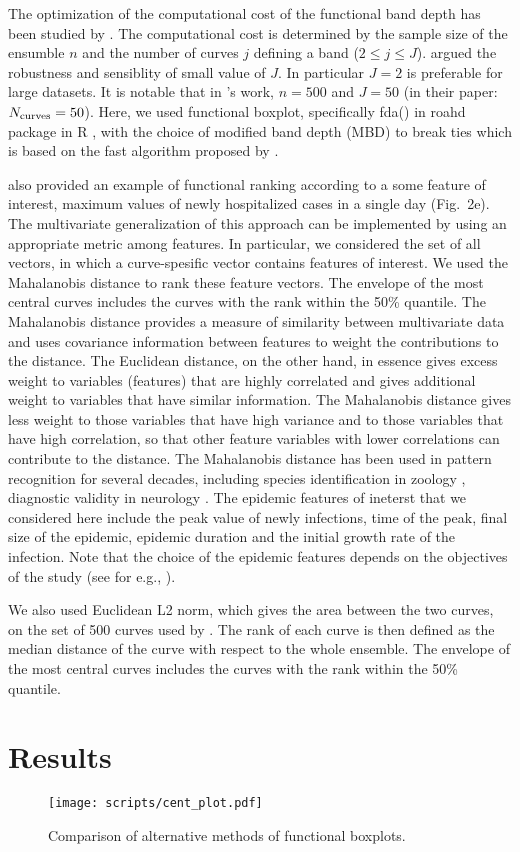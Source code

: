 \documentclass[12pt]{article}
\newcommand{\pkg}[1]{\textsf{#1}}  %
\theoremstyle{definition} %
\begin{document}
The optimization of the computational cost of the functional band depth has been studied by \citep{sun2012exact}. The computational cost is determined by the sample size of the ensumble $n$ and the number of curves $j$ defining a band ($2\leq j \leq J$). \cite{sun2012exact} argued the robustness and sensiblity of  small value of $J$. In particular $J=2$ is preferable for large datasets. It is notable that in \cite{juul2021fixed}'s work, $n=500$ and $J=50$ (in their paper: $N_{\rm{curves}}=50$). Here, we used functional boxplot, specifically fda() in \pkg{roahd} package \citep{roahd} in R \citep{R}, with the choice of modified band depth (MBD) to break ties which is based on the fast algorithm proposed by \cite{sun2012exact}.  

\cite{juul2021fixed} also provided an example of functional ranking according to a some feature of interest, maximum values of newly hospitalized cases in a single day (Fig.~2e). The multivariate generalization of this approach can be implemented by using an appropriate metric among features. In particular, we considered the set of all vectors, in which a curve-spesific vector contains features of interest. We used the Mahalanobis distance \citep{mahalanobis1936generalized} to rank these feature vectors. The envelope of the most central curves includes the curves with the rank within the 50\% quantile. The Mahalanobis distance provides a measure of similarity between multivariate data and uses covariance information between features to weight the contributions to the distance. The Euclidean distance, on the other hand, in essence gives excess weight to variables (features) that are highly correlated and gives additional weight to variables that have similar information. The Mahalanobis distance gives less weight to those variables that have high variance and to those variables that have high correlation, so that other feature variables with lower correlations can contribute to the distance. The Mahalanobis distance has been used in pattern recognition for several decades,
including species identification in zoology \citep{robinson1975geographical}, diagnostic validity in neurology \citep{john1988neurometrics}. The epidemic features of ineterst that we considered here include the peak value of newly infections, time of the peak, final size of the epidemic, epidemic duration and the initial growth rate of the infection. Note that the choice of the epidemic features depends on the objectives of the study (see for e.g., \cite{probert2016decision}).

We also used Euclidean L2 norm, which gives the area between the two curves, on the set of 500 curves used by \cite{juul2021fixed}. The rank of each curve is then defined as the median distance of the curve with respect to the whole ensemble. The envelope of the most central curves includes the curves with the rank within the 50\% quantile.


\section{Results}

\begin{figure}[h!]
\centering
\texttt{[image: scripts/cent\_plot.pdf]}
\caption{Comparison of alternative methods of functional boxplots.}\label{p.a}
\end{figure}



\end{document}
